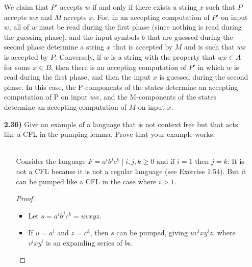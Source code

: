 \documentclass[12pt]{letter}
\begin{document}
\begin{enumerate}
\begin{itemize}
	\end{itemize}
	 We claim that $P'$ accepts $w$ if and only if there exists a string $x$ such that $P$ accepts $wx$ and $M$ accepts $x$. For, in an accepting computation of $P'$ on input $w$, all of $w$ must be read during the first phase (since nothing is read during the guessing phase), and the input symbols $b$ that are guessed during the second phase determine a string $x$ that is accepted by $M$ and is such that $wx$ is accepted by $P$. Conversely, if $w$ is a string with the property that $wx \in A$ for some $x \in B$, then there is an accepting computation of $P'$ in which $w$ is read during the first phase, and then the input $x$ is guessed during the second phase. In this case, the P-components of the states determine an accepting computation of P on input $wx$, and the M-components of the states determine an accepting computation of $M$ on input $x$.



\item[\textbf{2.36)}] Give an example of a language that is not context free but that acts like a CFL in the pumping lemma. Prove that your example works. \\
\leavevmode \\
 \begin{enumerate}
\item[] Consider the language $F = {a^ib^jc^k \mid i,j,k \geq 0 \text{ and if } i = 1 \text{ then } j = k}$.  It is not a CFL because it is not a regular language (see Exercise 1.54). But it can be pumped like a CFL in the case where $i > 1$.  \\
\begin{proof}
	\mbox{}
	\begin{itemize}
	  \item Let $s = a^i b^j c^k = uvxyz$.
	  \item If $u = a^i$ and $z = c^k$, then $s$ can be pumped, giving $uv^ixy^iz$,
	  where $v^ixy^i$ is an expanding series of $b$s.
	\end{itemize}
\end{proof}
\end{enumerate}



\end{enumerate}
\end{document}
